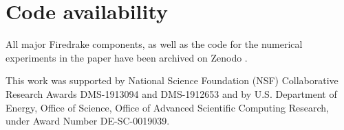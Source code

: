 \documentclass[format=acmsmall,screen,timestamp=false,a4paper]{acmart}
\newcommand\josh[1]{\textbf{\textcolor[rgb]{0,.5,1}{[Josh: #1]}}}
\begin{document}




\section*{Code availability}

All major Firedrake components, as well as the code for the numerical experiments in the paper have been archived on Zenodo \citep{zenodo/Firedrake-20210419.2}. 

\begin{acks}
This work was supported by National Science Foundation (NSF) Collaborative Research Awards DMS-1913094 and DMS-1912653 and by U.S. Department of Energy, Office of Science, Office of Advanced Scientific Computing Research, under Award Number DE-SC-0019039. 
    
  
\end{acks}
\end{document}
